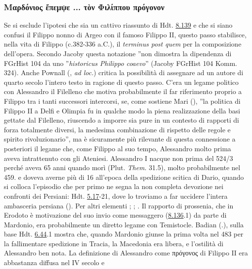 {\subsubsection{\textgreek{Μαρδόνιος ἔπεμψε ... τὸν Φιλίππου πρόγονον}} 
Se si esclude l'ipotesi che sia un cattivo riassunto di Hdt. \href{http://data.perseus.org/citations/urn:cts:greekLit:tlg0016.tlg001.perseus-grc1:8.139}{8.139} e che si siano confusi il Filippo nonno di Argeo con il famoso Filippo II, questo passo stabilisce, nella vita di Filippo (c.382-336 a.C.), il \emph{terminus post quem} per la composizione dell'opera. Secondo Jacoby questa notazione ''non dimostra la dipendenza di FGrHist 104 da uno ''\emph{historicus Philippo coaevo}'' (Jacoby FGrHist 104 Komm. 324). Anche Pownall (\cite*{Pownall2011}, \emph{ad loc.}) critica la possibilità di assegnare ad un autore di quarto secolo l'intero testo in ragione di questo passo. C'era un legame politico con Alessandro il Filelleno che motiva probabilmente il far riferimento proprio a Filippo tra i tanti successori intercorsi, se, come sostiene Mari (\cite[46]{Mari2000}), ''la politica di Filippo II a Delfi e Olimpia fu in qualche modo la piena realizzazione della basi gettate dal Filelleno, riuscendo a imporre sia pure in un contesto di rapporti di forza totalmente diversi, la medesima combinazione di rispetto delle regole e spirito rivoluzionario'', ma è sicuramente più rilevante di questa connessione a posteriori il legame che, come Filippo al suo tempo, Alessandro molto prima aveva intrattenuto con gli Ateniesi. Alessandro I nacque non prima del 524/3 perché aveva 65 anni quando morì (Plut. \emph{Them.}  31.5), molto probabilmente nel 459. e doveva averne più di 16 all'epoca della spedizione scitica di Dario, quando si colloca l'episodio che per primo ne segna la non completa devozione nei confronti dei Persiani: Hdt. \href{http://data.perseus.org/citations/urn:cts:greekLit:tlg0016.tlg001.perseus-grc1:5.17}{5.17}-21, dove lo troviamo a far uccidere l'intera ambasceria persiana (\cite[38]{Cole1978}). Per altri elementi \cite[131]{Scaife1989}; \cite[38]{Mari2000}; \cite[107]{Badian2006}. Il rapporto di prossenia, che in Erodoto è motivazione del suo invio come messaggero (\href{http://data.perseus.org/citations/urn:cts:greekLit:tlg0016.tlg001.perseus-grc1:8.136}{8.136}.1) da parte di Mardonio, era probabilmente un diretto legame con Temistocle. Badian (\cite[117s]{Badian2006}.), sulla base Hdt. \href{http://data.perseus.org/citations/urn:cts:greekLit:tlg0016.tlg001.perseus-grc1:6.44}{6.44}.1 mostra che, quando Mardonio giunse la prima volta nel 483 per la fallimentare spedizione in Tracia, la Macedonia era libera, e l'ostilità di Alessandro ben nota. La definizione di Alessandro come \textgreek{πρόγονος} di Filippo II era abbastanza diffusa nel IV secolo e  }
